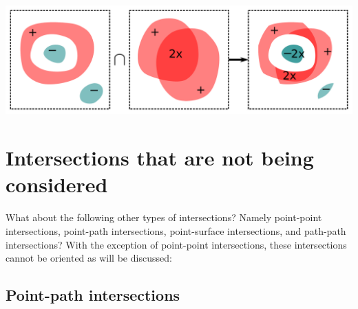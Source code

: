 \begin{center}
\includegraphics[width = \textwidth]{Intersections/Volume-volume_intersections/volume_volume_intersections_three_panel_example_2}
\end{center}




\section{Intersections that are not being considered}

What about the following other types of intersections? Namely point-point intersections, point-path intersections, point-surface intersections, and path-path intersections? With the exception of point-point intersections, these intersections cannot be oriented as will be discussed: 


\subsection{Point-path intersections}

